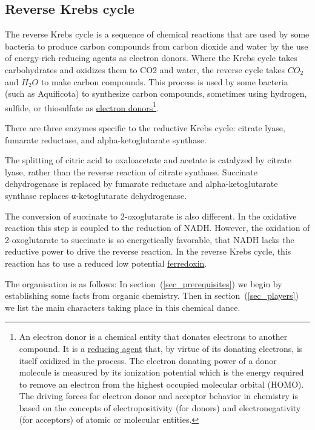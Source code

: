 \documentclass{article}
\begin{document}
\subsection{Reverse Krebs cycle}
The reverse Krebs cycle is a sequence of chemical reactions that are used by some bacteria
to produce carbon compounds from carbon dioxide and water by the use of energy-rich
reducing agents as electron donors.  Where the Krebs cycle takes carbohydrates and
oxidizes them to CO2 and water, the reverse cycle takes $CO_2$ and $H_2O$ to make carbon
compounds. This process is used by some bacteria (such as Aquificota) to synthesize carbon
compounds, sometimes using hydrogen, sulfide, or thiosulfate as
\href{https://en.wikipedia.org/wiki/Electron_donor}{electron donors}\footnote{An
electron donor is a chemical entity that donates electrons to another compound. It is a
\href{https://en.wikipedia.org/wiki/Reducing_agent}{reducing agent} that, by virtue of
its donating electrons, is itself oxidized in the
process. The electron donating power of a donor molecule is measured by its ionization
potential which is the energy required to remove an electron from the highest occupied
molecular orbital (HOMO). The driving forces for electron donor and acceptor behavior in
chemistry is based on the concepts of electropositivity (for donors) and electronegativity
(for acceptors) of atomic or molecular entities.}.

There are three enzymes specific to the reductive Krebs cycle: citrate lyase,
fumarate reductase, and alpha-ketoglutarate synthase.

The splitting of citric acid to oxaloacetate and acetate is catalyzed by citrate lyase,
rather than the reverse reaction of citrate synthase. Succinate dehydrogenase is
replaced by fumarate reductase and alpha-ketoglutarate synthase replaces α-ketoglutarate
dehydrogenase.

The conversion of succinate to 2-oxoglutarate is also different. In the oxidative reaction
this step is coupled to the reduction of NADH\@. However, the oxidation of 2-oxoglutarate to
succinate is so energetically favorable, that NADH lacks the reductive power to drive the
reverse reaction. In the reverse Krebs cycle, this reaction has to use a reduced low potential
\href{https://en.wikipedia.org/wiki/Ferredoxin}{ferredoxin}.

The organisation is as follows: In section~(\ref{sec_prerequisites}) we begin by
establishing some facts from organic chemistry. Then in section~(\ref{sec_players})
we list the main characters taking place in this chemical dance.
\end{document}
